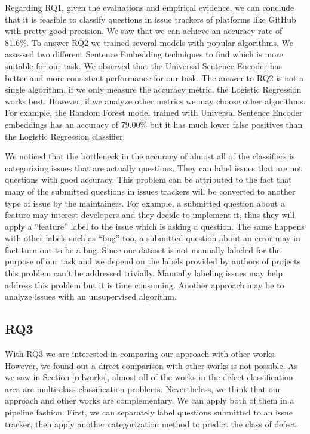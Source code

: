 \documentclass[conference]{IEEEtran}
\begin{document}
Regarding RQ1, given the evaluations and empirical evidence, we can conclude that it is feasible to classify 
questions in issue trackers of platforms like GitHub with pretty good precision. We saw that we can achieve 
an accuracy rate of 81.6\%. To answer RQ2 we trained several models with popular algorithms. We assessed two
different Sentence Embedding techniques to find which is more suitable for our task. We observed that the 
Universal Sentence Encoder has better and more consistent performance for our task. The answer to RQ2 is not a 
single algorithm, if we only measure the accuracy metric, the Logistic Regression works best. However, if we
analyze other metrics we may choose other algorithms. For example, the Random Forest model trained with
Universal Sentence Encoder embeddings has an accuracy of 79.00\% but it has much lower false positives than the 
Logistic Regression classifier.

We noticed that the bottleneck in the accuracy of almost all of the classifiers is categorizing issues that are 
actually questions. They can label issues that are not questions with good accuracy. This problem can be attributed 
to the fact that many of the submitted questions in issues trackers will be converted to another type of issue by 
the maintainers. For example, a submitted question about a feature may interest developers and they decide to 
implement it, thus they will apply a ``feature'' label to the issue which is asking a question. 
The same happens with other labels such as ``bug'' too, a submitted question about an error 
may in fact turn out to be a bug. Since our dataset is not manually labeled for the purpose of our task and we 
depend on the labels provided by authors of projects this problem can't be addressed trivially. 
Manually labeling issues may help address this problem but it is time consuming. Another approach may be to analyze 
issues with an unsupervised algorithm.

\subsection{RQ3}
With RQ3 we are interested in comparing our approach with other works. However, we found out 
a direct comparison with other works is not possible. As we saw in Section \ref{relworks}, almost 
all of the works in the defect classification area are multi-class classification problems. 
Nevertheless, we think that our approach and other works are complementary.
We can apply both of them in a pipeline fashion. First, we can separately label questions submitted to an 
issue tracker, then apply another categorization method to predict the class of defect.
\end{document}
